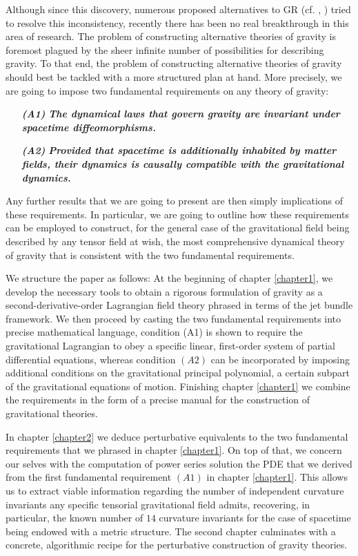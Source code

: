 \documentclass[%
 reprint,
nofootinbib,
 amsmath,amssymb,
 aps,
 prd,
floatfix,
]{revtex4-2}
\begin{document}
Although since this discovery, numerous proposed alternatives to GR (cf. \cite{2013LRR....16....9Y}, \cite{fR2}) tried to resolve this inconsistency, recently there has been no real breakthrough in this area of research. The problem of constructing alternative theories of gravity is foremost plagued by the sheer infinite number of possibilities for describing gravity. To that end, the problem of constructing alternative theories of gravity should best be tackled with a more structured plan at hand.
More precisely, we are going to impose two fundamental requirements on any theory of gravity: 
\begin{itemize}
    \item[\textbf{\textit{(A1)}}] \textbf{\textit{The dynamical laws that govern gravity are invariant under spacetime diffeomorphisms.}}
    \item[\textbf{\textit{(A2)}}] \textbf{\textit{Provided that spacetime is additionally inhabited by matter fields, their dynamics is causally compatible with the gravitational dynamics.}}
\end{itemize}

Any further results that we are going to present are then simply implications of these requirements. In particular, we are going to outline how these requirements can be employed to construct, for the general case of the gravitational field being described by any tensor field at wish, the most comprehensive dynamical theory of gravity that is consistent with the two fundamental requirements. 

We structure the paper as follows: 
At the beginning of chapter \ref{chapter1}, we develop the necessary tools to obtain a rigorous formulation of gravity as a second-derivative-order Lagrangian field theory phrased in terms of the jet bundle framework. We then proceed by casting the two fundamental requirements into precise mathematical language, condition (A1) is shown to require the gravitational Lagrangian to obey a specific linear, first-order system of partial differential equations, whereas condition $(A2)$ can be incorporated by imposing additional conditions on the gravitational principal polynomial, a certain subpart of the gravitational equations of motion. Finishing chapter \ref{chapter1} we combine the requirements in the form of a precise manual for the construction of gravitational theories.

In chapter \ref{chapter2} we deduce perturbative equivalents to the two fundamental requirements that we phrased in chapter \ref{chapter1}. On top of that, we concern our selves with the computation of power series solution the PDE that we derived from the first fundamental requirement $(A1)$ in chapter \ref{chapter1}. This allows us to extract viable information regarding the number of independent curvature invariants any specific tensorial gravitational field admits, recovering, in particular, the known number of $14$ curvature invariants for the case of spacetime being endowed with a metric structure. 
The second chapter culminates with a concrete, algorithmic recipe for the perturbative construction of gravity theories. 
\end{document}
